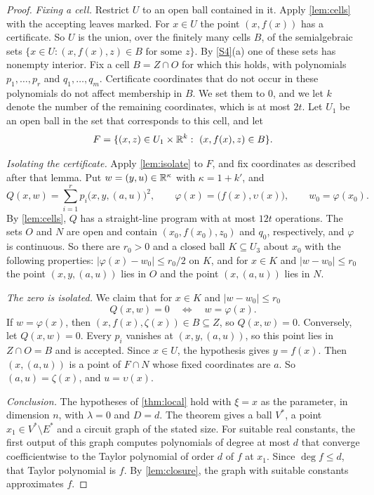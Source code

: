 \begin{proof}
\emph{Fixing a cell.} Restrict $U$ to an open ball contained in it. Apply \cref{lem:cells} with the accepting leaves marked. For $x\in U$ the point $(x,f(x))$ has a certificate. So $U$ is the union, over the finitely many cells $B$, of the semialgebraic sets $\{x\in U:(x,f(x),z)\in B\text{ for some }z\}$. By \ref{S4}(a) one of these sets has nonempty interior. Fix a cell $B=Z\cap O$ for which this holds, with polynomials $p_1,\dots,p_r$ and $q_1,\dots,q_m$. Certificate coordinates that do not occur in these polynomials do not affect membership in $B$. We set them to $0$, and we let $k$ denote the number of the remaining coordinates, which is at most $2t$. Let $U_1$ be an open ball in the set that corresponds to this cell, and let
\[
F=\{(x,z)\in U_1\times\mathbb{R}^k:\ (x,f(x),z)\in B\}.
\]

\emph{Isolating the certificate.} Apply \cref{lem:isolate} to $F$, and fix coordinates as described after that lemma. Put $w=(y,u)\in\mathbb{R}^\kappa$ with $\kappa=1+k'$, and
\[
Q(x,w)=\sum_{i=1}^rp_i\bigl(x,y,(a,u)\bigr)^2,\qquad\varphi(x)=\bigl(f(x),\upsilon(x)\bigr),\qquad w_0=\varphi(x_0).
\]
By \cref{lem:cells}, $Q$ has a straight-line program with at most $12t$ operations. The sets $O$ and $N$ are open and contain $(x_0,f(x_0),z_0)$ and $q_0$, respectively, and $\varphi$ is continuous. So there are $r_0>0$ and a closed ball $K\subseteq U_3$ about $x_0$ with the following properties: $|\varphi(x)-w_0|\le r_0/2$ on $K$, and for $x\in K$ and $|w-w_0|\le r_0$ the point $(x,y,(a,u))$ lies in $O$ and the point $(x,(a,u))$ lies in $N$.

\emph{The zero is isolated.} We claim that for $x\in K$ and $|w-w_0|\le r_0$
\[
Q(x,w)=0\quad\Longleftrightarrow\quad w=\varphi(x).
\]
If $w=\varphi(x)$, then $(x,f(x),\zeta(x))\in B\subseteq Z$, so $Q(x,w)=0$. Conversely, let $Q(x,w)=0$. Every $p_i$ vanishes at $(x,y,(a,u))$, so this point lies in $Z\cap O=B$ and is accepted. Since $x\in U$, the hypothesis gives $y=f(x)$. Then $(x,(a,u))$ is a point of $F\cap N$ whose fixed coordinates are $a$. So $(a,u)=\zeta(x)$, and $u=\upsilon(x)$.

\emph{Conclusion.} The hypotheses of \cref{thm:local} hold with $\xi=x$ as the parameter, in dimension $n$, with $\lambda=0$ and $D=d$. The theorem gives a ball $V^*$, a point $x_1\in V^*\setminus E^*$ and a circuit graph of the stated size. For suitable real constants, the first output of this graph computes polynomials of degree at most $d$ that converge coefficientwise to the Taylor polynomial of order $d$ of $f$ at $x_1$. Since $\deg f\le d$, that Taylor polynomial is $f$. By \cref{lem:closure}, the graph with suitable constants approximates $f$.
\end{proof}

